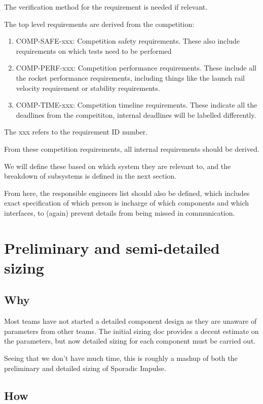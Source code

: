 \documentclass[12pt]{article}
\begin{document}
The verification method for the requirement is needed if relevant. 

The top level requirements are derived from the competition:
\begin{enumerate}
\item COMP-SAFE-xxx: Competition safety requirements. These also include requirements on which tests need to be performed
\item COMP-PERF-xxx: Competition performance requirements. These include all the rocket performance requirements, including things like the launch rail velocity requirement or stability requirements.
\item COMP-TIME-xxx: Competition timeline requirements. These indicate all the deadlines from the compeititon, internal deadlines will be labelled differently.
\end{enumerate}

The xxx refers to the requirement ID number. 

From these competition requirements, all internal requirements should be derived. 

We will define these based on which system they are relevant to, and the breakdown of subsystems is defined in the next section. 

From here, the responsible engineers list should also be defined, which includes exact specification of which person is incharge of which components and which interfaces, to (again) prevent details from being missed in communication. 


\section{Preliminary and semi-detailed sizing}


\subsection{Why}

Most teams have not started a detailed component design as they are unaware of parameters from other teams. The initial sizing doc provides a decent estimate on the parameters, but now detailed sizing for each component must be carried out. 

Seeing that we don't have much time, this is roughly a mashup of both the preliminary and detailed sizing of Sporadic Impulse. 

\subsection{How}
\end{document}
